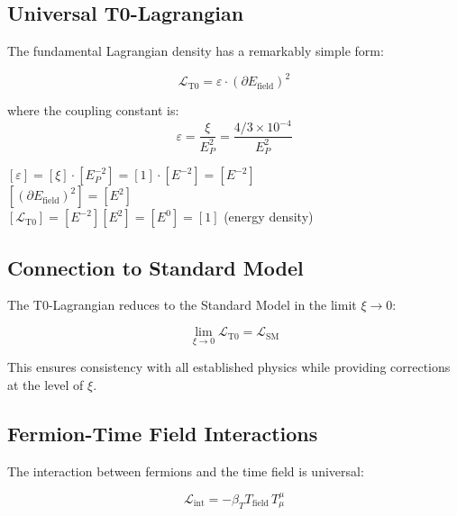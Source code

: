 \documentclass[12pt,a4paper]{article}
\theoremstyle{definition}
\begin{document}
\subsection{Universal T0-Lagrangian}

The fundamental Lagrangian density has a remarkably simple form:

\begin{equation}
	\boxed{\mathcal{L}_{\text{T0}} = \varepsilon \cdot (\partial E_{\text{field}})^2}
\end{equation}

where the coupling constant is:
\begin{equation}
	\varepsilon = \frac{\xi}{E_P^2} = \frac{4/3 \times 10^{-4}}{E_P^2}
\end{equation}

\begin{einheitencheck}
	$[\varepsilon] = [\xi] \cdot [E_P^{-2}] = [1] \cdot [E^{-2}] = [E^{-2}]$ \checkmark\\
	$[(\partial E_{\text{field}})^2] = [E^2]$ \checkmark\\
	$[\mathcal{L}_{\text{T0}}] = [E^{-2}][E^2] = [E^0] = [1]$ (energy density) \checkmark
\end{einheitencheck}

\subsection{Connection to Standard Model}

The T0-Lagrangian reduces to the Standard Model in the limit $\xi \to 0$:

\begin{equation}
	\lim_{\xi \to 0} \mathcal{L}_{\text{T0}} = \mathcal{L}_{\text{SM}}
\end{equation}

This ensures consistency with all established physics while providing corrections at the level of $\xi$.

\subsection{Fermion-Time Field Interactions}

The interaction between fermions and the time field is universal:

\begin{equation}
	\boxed{\mathcal{L}_{\text{int}} = -\beta_T T_{\text{field}} \, T^\mu_\mu}
\end{equation}
\end{document}
